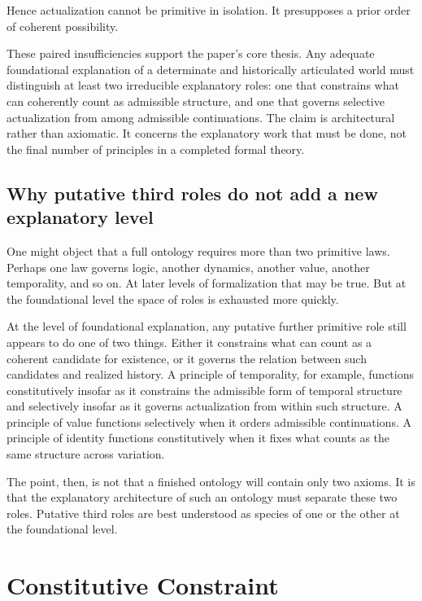 \documentclass[11pt]{article}
\theoremstyle{foundation}
\begin{document}
Hence actualization cannot be primitive in isolation. It presupposes a prior order of coherent possibility.

These paired insufficiencies support the paper's core thesis. Any adequate foundational explanation of a determinate and historically articulated world must distinguish at least two irreducible explanatory roles: one that constrains what can coherently count as admissible structure, and one that governs selective actualization from among admissible continuations. The claim is architectural rather than axiomatic. It concerns the explanatory work that must be done, not the final number of principles in a completed formal theory.

\subsection{Why putative third roles do not add a new explanatory level}

One might object that a full ontology requires more than two primitive laws. Perhaps one law governs logic, another dynamics, another value, another temporality, and so on. At later levels of formalization that may be true. But at the foundational level the space of roles is exhausted more quickly.

At the level of foundational explanation, any putative further primitive role still appears to do one of two things. Either it constrains what can count as a coherent candidate for existence, or it governs the relation between such candidates and realized history. A principle of temporality, for example, functions constitutively insofar as it constrains the admissible form of temporal structure and selectively insofar as it governs actualization from within such structure. A principle of value functions selectively when it orders admissible continuations. A principle of identity functions constitutively when it fixes what counts as the same structure across variation.

The point, then, is not that a finished ontology will contain only two axioms. It is that the explanatory architecture of such an ontology must separate these two roles. Putative third roles are best understood as species of one or the other at the foundational level.

\section{Constitutive Constraint}
\end{document}
